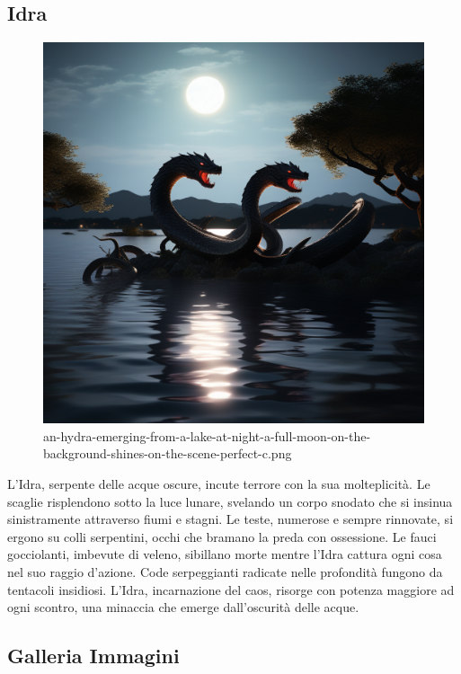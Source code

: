 \subsection{Idra}\label{idra}

\begin{figure}
\centering
\includegraphics{an-hydra-emerging-from-a-lake-at-night-a-full-moon-on-the-background-shines-on-the-scene-perfect-c.png}
\caption{an-hydra-emerging-from-a-lake-at-night-a-full-moon-on-the-background-shines-on-the-scene-perfect-c.png}
\end{figure}

L'Idra, serpente delle acque oscure, incute terrore con la sua
molteplicità. Le scaglie risplendono sotto la luce lunare, svelando un
corpo snodato che si insinua sinistramente attraverso fiumi e stagni. Le
teste, numerose e sempre rinnovate, si ergono su colli serpentini, occhi
che bramano la preda con ossessione. Le fauci gocciolanti, imbevute di
veleno, sibillano morte mentre l'Idra cattura ogni cosa nel suo raggio
d'azione. Code serpeggianti radicate nelle profondità fungono da
tentacoli insidiosi. L'Idra, incarnazione del caos, risorge con potenza
maggiore ad ogni scontro, una minaccia che emerge dall'oscurità delle
acque.

\subsection{Galleria Immagini}\label{galleria-immagini}

